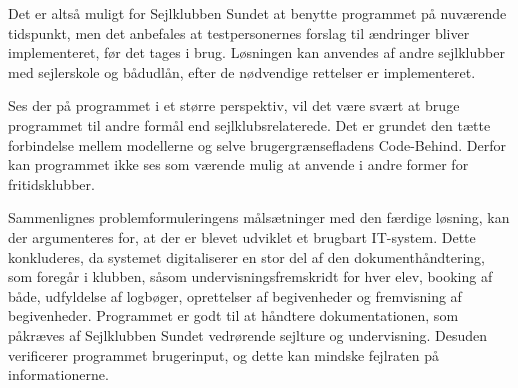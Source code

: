Det er altså muligt for Sejlklubben Sundet at benytte programmet på nuværende tidspunkt, men det anbefales at testpersonernes forslag til ændringer bliver implementeret, før det tages i brug.
Løsningen kan anvendes af andre sejlklubber med sejlerskole og bådudlån, efter de nødvendige rettelser er implementeret. 

Ses der på programmet i et større perspektiv, vil det være svært at bruge programmet til andre formål end sejlklubsrelaterede. 
Det er grundet den tætte forbindelse mellem modellerne og selve brugergrænsefladens Code-Behind. 
Derfor kan programmet ikke ses som værende mulig at anvende i andre former for fritidsklubber. 

Sammenlignes problemformuleringens målsætninger med den færdige løsning, kan der argumenteres for, at der er blevet udviklet et brugbart IT-system. 
Dette konkluderes, da systemet digitaliserer en stor del af den dokumenthåndtering, som foregår i klubben, såsom undervisningsfremskridt for hver elev, booking af både, udfyldelse af logbøger, oprettelser af begivenheder og fremvisning af begivenheder.
Programmet er godt til at håndtere dokumentationen, som påkræves af Sejlklubben Sundet vedrørende sejlture og undervisning.
Desuden verificerer programmet brugerinput, og dette kan mindske fejlraten på informationerne.